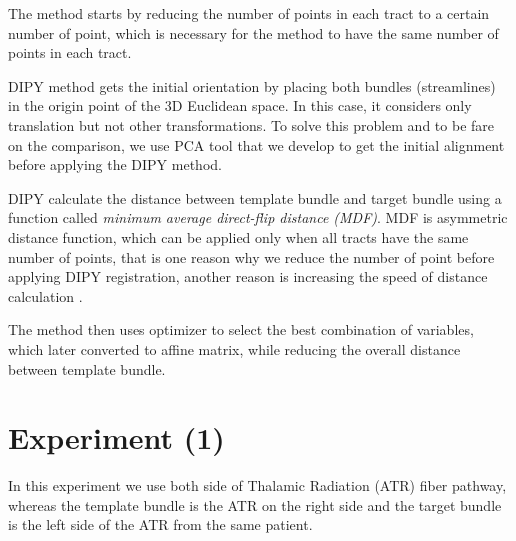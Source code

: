 \documentclass[../structure.tex]{subfiles}
\begin{document}
The method starts by reducing the number of points in each tract to a certain number of point, which is necessary for the method to have the same number of points in each tract.

DIPY method gets the initial orientation by placing both bundles (streamlines) in the origin point of the 3D Euclidean space. In this case, it considers only translation but not other transformations. To solve this problem and to be fare on the comparison, we use PCA tool that we develop to get the initial alignment before applying the DIPY method.

DIPY calculate the distance between template bundle and target bundle using a function called \textit{minimum average direct-flip distance (MDF)}. MDF is asymmetric
distance function, which can be applied only when all tracts have the same number of points, that is one reason why we reduce the number of point before applying DIPY registration, another reason is increasing the speed of distance calculation \cite{Garyfallidis2012}.

The method then uses optimizer to select the best combination of variables, which later converted to affine matrix, while reducing the overall distance between template bundle.

\begin{comment}
\section{ICP testing steps}
\begin{itemize}
\item Read bundles from \textit{ply} files
\item Save the visual orientation of the original alignment
\item Apply PCA
\item Visualize bundles after PCA and compare with original visual orientation
\item If the visual inspection was positive and PCA improved the alignment, we consider its result, otherwise we just flip the template bundle or consider the original orientation
\item Generate distances histogram between two bundles to select the distance threshold
\item Start the registration and iterate until there is no more improvement on the alignment
\end{itemize}
\end{comment}

\section{Experiment (1)}
\hspace{2em}In this experiment we use both side of Thalamic Radiation (ATR) fiber pathway, whereas the template bundle is the ATR on the right side and the target bundle is the left side of the ATR from the same patient.
\end{document}
